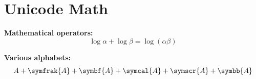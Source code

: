 \documentclass[a4paper,12pt]{article}
\begin{document}
\section*{Unicode Math}

\textbf{Mathematical operators:}
\[
\log \alpha + \log \beta = \log(\alpha\beta)
\]

\textbf{Various alphabets:}
\[
A + \symfrak{A} + \symbf{A} + \symcal{A} + \symscr{A} + \symbb{A}
\]
\end{document}
